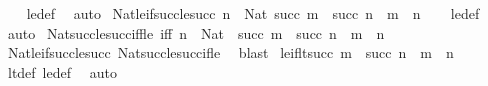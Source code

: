 \begin{isabellebody}
%
\isadelimproof
\ \ %
\endisadelimproof
%
\isatagproof
{}\isamarkupfalse%
\ le{\isacharunderscore}{\kern0pt}def\ \isamarkupfalse%
\ auto%
\endisatagproof
{\isafoldproof}%
%
\isadelimproof
\isanewline
%
\endisadelimproof
\isanewline
{}\isamarkupfalse%
\ Nat{\isacharunderscore}{\kern0pt}le{\isacharunderscore}{\kern0pt}if{\isacharunderscore}{\kern0pt}succ{\isacharunderscore}{\kern0pt}le{\isacharunderscore}{\kern0pt}succ{\isacharcolon}{\kern0pt}\ {\isachardoublequoteopen}{\isasymlbrakk}n\ {\isacharcolon}{\kern0pt}\ Nat{\isacharsemicolon}{\kern0pt}\ succ\ m\ {\isasymle}\ succ\ n{\isasymrbrakk}\ {\isasymLongrightarrow}\ m\ {\isasymle}\ n{\isachardoublequoteclose}\isanewline
%
\isadelimproof
\ \ %
\endisadelimproof
%
\isatagproof
{}\isamarkupfalse%
\ le{\isacharunderscore}{\kern0pt}def\ \isamarkupfalse%
\ auto%
\endisatagproof
{\isafoldproof}%
%
\isadelimproof
\isanewline
%
\endisadelimproof
\isanewline
{}\isamarkupfalse%
\ Nat{\isacharunderscore}{\kern0pt}succ{\isacharunderscore}{\kern0pt}le{\isacharunderscore}{\kern0pt}succ{\isacharunderscore}{\kern0pt}iff{\isacharunderscore}{\kern0pt}le\ {\isacharbrackleft}{\kern0pt}iff{\isacharbrackright}{\kern0pt}{\isacharcolon}{\kern0pt}\ {\isachardoublequoteopen}n\ {\isacharcolon}{\kern0pt}\ Nat\ {\isasymLongrightarrow}\ succ\ m\ {\isasymle}\ succ\ n\ {\isasymlongleftrightarrow}\ m\ {\isasymle}\ n{\isachardoublequoteclose}\isanewline
%
\isadelimproof
\ \ %
\endisadelimproof
%
\isatagproof
{}\isamarkupfalse%
\ Nat{\isacharunderscore}{\kern0pt}le{\isacharunderscore}{\kern0pt}if{\isacharunderscore}{\kern0pt}succ{\isacharunderscore}{\kern0pt}le{\isacharunderscore}{\kern0pt}succ\ Nat{\isacharunderscore}{\kern0pt}succ{\isacharunderscore}{\kern0pt}le{\isacharunderscore}{\kern0pt}succ{\isacharunderscore}{\kern0pt}if{\isacharunderscore}{\kern0pt}le\ \isamarkupfalse%
\ blast%
\endisatagproof
{\isafoldproof}%
%
\isadelimproof
\isanewline
%
\endisadelimproof
\isanewline
{}\isamarkupfalse%
\ le{\isacharunderscore}{\kern0pt}if{\isacharunderscore}{\kern0pt}lt{\isacharunderscore}{\kern0pt}succ{\isacharcolon}{\kern0pt}\ {\isachardoublequoteopen}m\ {\isacharless}{\kern0pt}\ succ\ n\ {\isasymLongrightarrow}\ m\ {\isasymle}\ n{\isachardoublequoteclose}\isanewline
%
\isadelimproof
\ \ %
\endisadelimproof
%
\isatagproof
{}\isamarkupfalse%
\ lt{\isacharunderscore}{\kern0pt}def\ le{\isacharunderscore}{\kern0pt}def\ \isamarkupfalse%
\ auto%
\endisatagproof
{\isafoldproof}%

\end{isabellebody}
